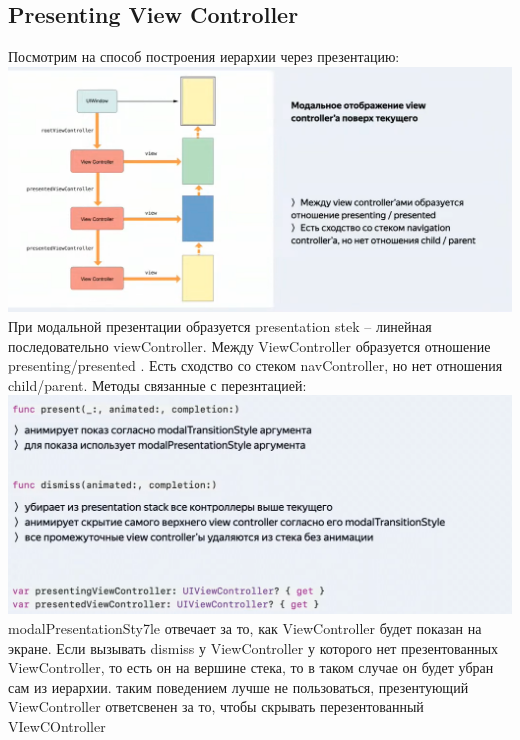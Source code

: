 \documentclass{article}
\begin{document}
    \subsection{Presenting View Controller}
    Посмотрим на способ построения иерархии через презентацию:
    \includegraphics[scale = 0.5]{pic/Снимок экрана 2023-08-03 в 19.11.38.png}
    \newline
    При модальной презентации образуется presentation stek -- линейная последовательно viewController. Между ViewController образуется отношение presenting/presented . Есть сходство со стеком navController, но нет отношения child/parent. 
    \newline
    Методы связанные с перезнтацией: 
    \newline
    \includegraphics[scale = 0.3]{pic/Снимок экрана 2023-08-03 в 19.13.51.png}
    modalPresentationSty7le отвечает за то, как ViewController будет показан на экране. 
    \newline
    Если вызывать dismiss у ViewController у которого нет презентованных ViewController, то есть он на вершине стека, то в таком случае он будет убран сам из иерархии. 
    \newline
    таким поведением лучше не пользоваться, презентующий ViewController ответсвенен за то, чтобы скрывать перезентованный VIewCOntroller
    \newline
\end{document}
